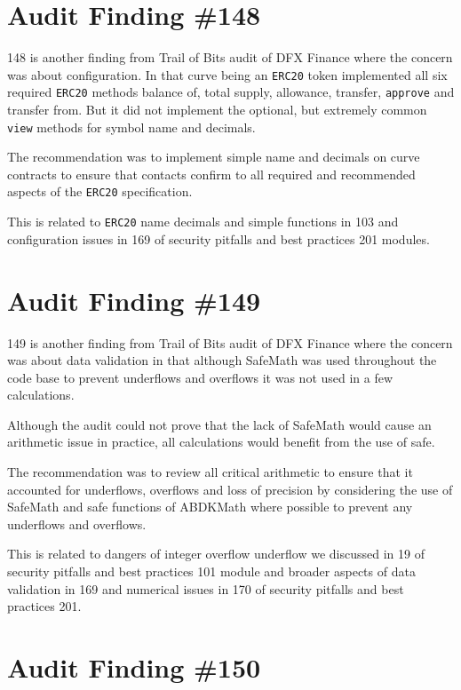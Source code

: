 \section{Audit Finding \#148}

148 is another finding from Trail of Bits audit of DFX Finance where the concern was about configuration. In that curve being an \verb|ERC20| token implemented all six required \verb|ERC20| methods balance of, total supply, allowance, transfer, \verb|approve| and transfer from. But it did not implement the optional, but extremely common \verb|view| methods for symbol name and decimals.

The recommendation was to implement simple name and decimals on curve contracts to ensure that contacts confirm to all required and recommended aspects of the \verb|ERC20| specification.

This is related to \verb|ERC20| name decimals and simple functions in 103 and configuration issues in 169 of security pitfalls and best practices 201 modules.

\section{Audit Finding \#149}

149 is another finding from Trail of Bits audit of DFX Finance where the concern was about data validation in that although SafeMath was used throughout the code base to prevent underflows and overflows it was not used in a few calculations. 

Although the audit could not prove that the lack of SafeMath would cause an arithmetic issue in practice, all calculations would benefit from the use of safe.

The recommendation was to review all critical arithmetic to ensure that it accounted for underflows, overflows and loss of precision by considering the use of SafeMath and safe functions of ABDKMath where possible to prevent any underflows and overflows.

This is related to dangers of integer overflow underflow we discussed in 19 of security pitfalls and best practices 101 module and broader aspects of data validation in 169 and numerical issues in 170 of security pitfalls and best practices 201.

\section{Audit Finding \#150}

